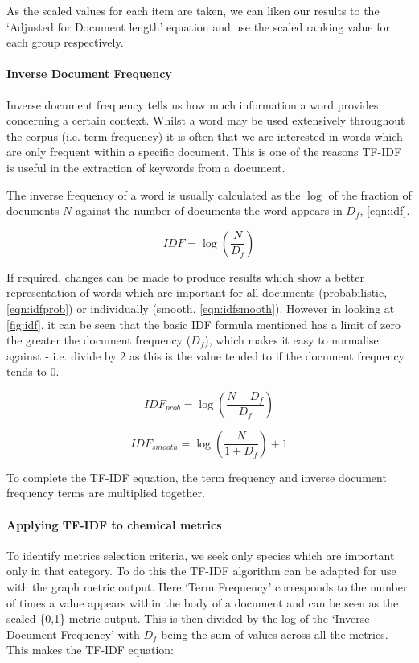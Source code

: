 As the scaled values for each item are taken, we can liken our results to the `Adjusted for Document length' equation and use the scaled ranking value for each group respectively.

\paragraph*{Inverse Document Frequency}
Inverse document frequency tells us how much information a word provides concerning a certain context. Whilst a word may be used extensively throughout the corpus (i.e. term frequency) it is often that we are interested in words which are only frequent within a specific document. This is one of the reasons TF-IDF is useful in the extraction of keywords from a document. 

The inverse frequency of a word is usually calculated as the $\log$ of the fraction of documents $N$ against the number of documents the word appears in $D_f$, \autoref{eqn:idf}.


\begin{equation}
    IDF = \log(\frac{N}{D_f})
    \label{eqn:idf}
\end{equation}

If required, changes can be made to produce results which show a better representation of words which are important for all documents (probabilistic, \autoref{eqn:idfprob}) or individually (smooth, \autoref{eqn:idfsmooth}). However in looking at \autoref{fig:idf}, it can be seen that the basic IDF formula mentioned has a limit of zero the greater the document frequency ($D_f$), which makes it easy to normalise against - i.e. divide by 2 as this is the value tended to if the document frequency tends to 0.    


\begin{equation}
    IDF_{prob} = \log(\frac{N-D_f}{D_f})
    \label{eqn:idfprob}
\end{equation}

\begin{equation}
    IDF_{smooth} = \log(\frac{N}{1+D_f})+1
    \label{eqn:idfsmooth}
\end{equation}




To complete the TF-IDF equation, the term frequency and inverse document frequency terms are multiplied together. 

\paragraph*{Applying TF-IDF to chemical metrics}
To identify metrics selection criteria, we seek only species which are important only in that category. To do this the TF-IDF algorithm can be adapted for use with the graph metric output. Here `Term Frequency' corresponds to the number of times a value appears within the body of a document and can be seen as the scaled \{0,1\} metric output. This is then divided by the log of the `Inverse Document Frequency' with $D_f$ being the sum of values across all the metrics. This makes the TF-IDF equation: 

